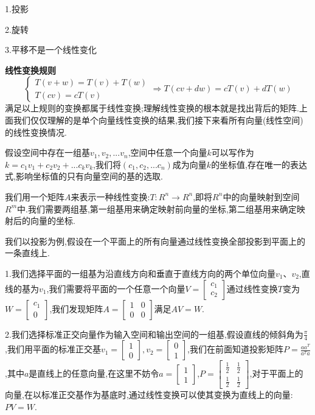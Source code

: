 \documentclass[oneside]{book}
\begin{document}
	1.投影
	
	2.旋转
	
	3.平移不是一个线性变化
	
	\textbf{线性变换规则}
	$$\left\{\begin{array}{c}
		T(v+w)=T(v)+T(w)\\T(cv)=cT(v)
	\end{array}\right.\Rightarrow T(cv+dw)=cT(v)+dT(w)$$满足以上规则的变换都属于线性变换;理解线性变换的根本就是找出背后的矩阵.上面我们仅仅理解的是单个向量线性变换的结果,我们接下来看所有向量(线性空间)的线性变换情况.

	假设空间中存在一组基$v_{1},v_{2},...v_{n}$,空间中任意一个向量$k$可以写作为$k=c_{1}v_{1}+c_{2}v_{2}+...c_{k}v_{k}$,我们将$(c_{1},c_{2},...c_{n})$成为向量$k$的坐标值,存在唯一的表达式,影响坐标值的只有向量空间的基的选取.
	
	我们用一个矩阵$A$来表示一种线性变换:$T:R^{n}\rightarrow R^{n}$,即将$R^{n}$中的向量映射到空间$ R^{m} $中.我们需要两组基,第一组基用来确定映射前向量的坐标,第二组基用来确定映射后的向量的坐标.
	
	我们以投影为例,假设在一个平面上的所有向量通过线性变换全部投影到平面上的一条直线上.
	
	1.我们选择平面的一组基为沿直线方向和垂直于直线方向的两个单位向量$v_{1}、v_{2}$,直线的基为$v_{1}$,我们需要将平面的一个任意一个向量$V=\left[\begin{array}{c}
		c_{1}\\c_{2}
	\end{array}\right]$通过线性变换$T$变为$W=\left[\begin{array}{c}
	c_{1}\\0
\end{array}\right]$,我们发现矩阵$A=\left[\begin{array}{cc}
1&0\\0&0
\end{array}\right]$满足$AV=W$.

	2.我们选择标准正交向量作为输入空间和输出空间的一组基,假设直线的倾斜角为$\frac{\pi}{4}$
	,我们用平面的标准正交基$v_{1}=\left[\begin{array}{c}
		1\\0
	\end{array}\right],v_{2}=\left[\begin{array}{c}
	0\\1
\end{array}\right]$,我们在前面知道投影矩阵$P=\frac{aa^{T}}{a^{T}a}$,其中$a$是直线上的任意向量,在这里不妨令$a=\left[\begin{array}{c}
1\\1
\end{array}\right]$,$P=\left[\begin{array}{cc}
\frac{1}{2}&\frac{1}{2}\\\frac{1}{2}&\frac{1}{2}
\end{array}\right]$,对于平面上的向量,在以标准正交基作为基底时,通过线性变换可以使其变换为直线上的向量:$PV=W$.
\end{document}
